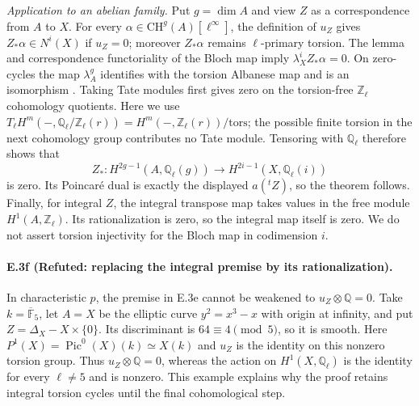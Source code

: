\emph{Application to an abelian family.}
Put $g=\dim A$ and view $Z$ as a correspondence from $A$ to $X$.
For every $\alpha\in\mathrm{CH}^g(A)[\ell^\infty]$, the
definition of $u_Z$ gives
$Z_*\alpha\in N^i(X)$ if $u_Z=0$; moreover $Z_*\alpha$ remains
$\ell$-primary torsion. The lemma and correspondence
functoriality of the Bloch map
\citep[Proposition 3.5]{cyBloch1979} imply
$\lambda_X^i Z_*\alpha=0$. On zero-cycles the map
$\lambda_A^g$ identifies with the torsion Albanese map and is
an isomorphism
\citep[Proposition 3.9 and Theorem 4.2]{cyBloch1979}.
Taking Tate modules first gives zero on the torsion-free
$\mathbb Z_\ell$ cohomology quotients. Here we use
$T_\ell H^m(-,\mathbb Q_\ell/\mathbb Z_\ell(r))
=H^m(-,\mathbb Z_\ell(r))/\mathrm{tors}$; the possible finite
torsion in the next cohomology group contributes no Tate module.
Tensoring with $\mathbb Q_\ell$ therefore shows that
\[
 Z_*:H^{2g-1}(A,\mathbb Q_\ell(g))
           \longrightarrow H^{2i-1}(X,\mathbb Q_\ell(i))
\]
is zero. Its Poincar\'e dual is exactly the displayed
$a({}^tZ)$, so the theorem follows. Finally, for integral $Z$,
the integral transpose map takes values in the free module
$H^1(A,\mathbb Z_\ell)$. Its rationalization is zero, so the
integral map itself is zero. We do not assert torsion
injectivity for the Bloch map in codimension $i$.

\paragraph{E.3f (Refuted: replacing the integral premise by its rationalization).}
In characteristic $p$, the premise in E.3e cannot be weakened to
$u_Z\otimes\mathbb Q=0$. Take
$k=\overline{\mathbb F}_5$, let $A=X$ be the elliptic curve
$y^2=x^3-x$ with origin at infinity, and put
$Z=\Delta_X-X\times\{0\}$. Its discriminant is
$64\equiv4\pmod5$, so it is smooth. Here
$P^1(X)=\operatorname{Pic}^0(X)(k)\simeq X(k)$ and $u_Z$ is
the identity on this nonzero torsion group. Thus
$u_Z\otimes\mathbb Q=0$, whereas the action on $H^1(X,\mathbb Q_\ell)$
is the identity for every $\ell\ne5$ and is nonzero. This example
explains why the proof retains integral torsion cycles until
the final cohomological step.



